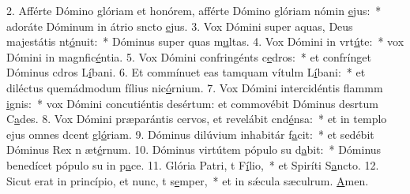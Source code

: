 2. Afférte Dómino glóriam et honórem, afférte Dómino glóriam nómin \uline{e}jus:~* adoráte Dóminum in átrio sncto \uline{e}jus.
3. Vox Dómini super aquas, Deus majestátis nt\uline{ó}nuit:~* Dóminus super quas m\uline{u}ltas.
4. Vox Dómini in vrt\uline{ú}te:~* vox Dómini in magnfic\uline{é}ntia.
5. Vox Dómini confringénts c\uline{e}dros:~* et confrínget Dóminus cdros L\uline{í}bani.
6. Et commínuet eas tamquam vítulm L\uline{í}bani:~* et diléctus quemádmodum fílius nic\uline{ó}rnium.
7. Vox Dómini intercidéntis flammm \uline{i}gnis:~* vox Dómini concutiéntis desértum: et commovébit Dóminus desrtum C\uline{a}des.
8. Vox Dómini præparántis cervos, et revelábit cnd\uline{é}nsa:~* et in templo ejus omnes dcent gl\uline{ó}riam.
9. Dóminus dilúvium inhabitár f\uline{a}cit:~* et sedébit Dóminus Rex n æt\uline{é}rnum.
10. Dóminus virtútem pópulo su d\uline{a}bit:~* Dóminus benedícet pópulo su in p\uline{a}ce.
11. Glória Patri, t F\uline{í}lio,~* et Spiríti S\uline{a}ncto.
12. Sicut erat in princípio, et nunc, t s\uline{e}mper,~* et in sǽcula sæculrum. \uline{A}men.
